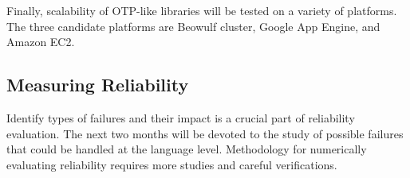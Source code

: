 Finally, scalability of OTP-like libraries will be tested on a variety of platforms.  The three candidate platforms are Beowulf cluster, Google App Engine, and Amazon EC2.


\subsection{Measuring Reliability}

Identify types of failures and their impact is a crucial part of reliability evaluation.  The next two months will be devoted to the study of possible failures that could be handled at the language level.  Methodology for numerically evaluating reliability requires more studies and careful verifications.


